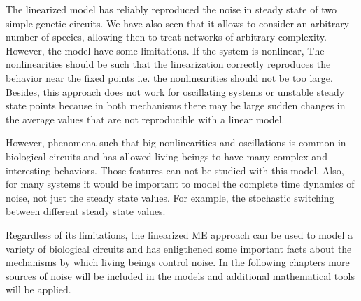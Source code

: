 The linearized model has reliably reproduced the noise in steady state of two simple genetic circuits. We have also seen that it allows to consider an arbitrary number of species, allowing then to treat networks of arbitrary complexity. However, the model have some limitations. If the system is nonlinear, The nonlinearities should be such that the linearization correctly reproduces the behavior near the fixed points i.e. the nonlinearities should not be too large. Besides, this approach does not work for oscillating systems or unstable steady state points because in both mechanisms there may be large sudden changes in the average values that are not reproducible with a linear model.

However, phenomena such that big nonlinearities and oscillations is common in biological circuits and has allowed living beings to have many complex and interesting behaviors. Those features can not be studied with this model. Also, for many systems it would be important to model the complete time dynamics of noise, not just the steady state values. For example, the stochastic switching between different steady state values.

Regardless of its limitations, the linearized ME approach can be used to model a variety of biological circuits and has enligthened some important facts about the mechanisms by which living beings control noise. In the following chapters more sources of noise will be included in the models and additional mathematical tools will be applied.
